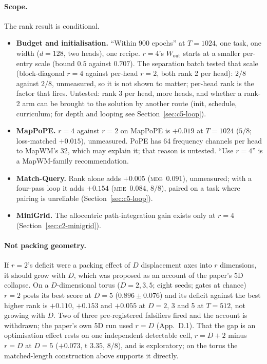 \documentclass[10pt]{article}
\newcommand{\mde}{\textsc{mde}}
\begin{document}
\paragraph{Scope.} The rank result is conditional.
\begin{itemize}
\item \textbf{Budget and initialisation.} ``Within 900 epochs'' at $T=1024$, one task, one width ($d=128$, two
heads), one recipe. $r=4$'s $W_{\mathrm{out}}$ starts at a smaller per-entry scale (bound $0.5$ against $0.707$). The
separation batch tested that scale (block-diagonal $r=4$ against per-head $r=2$, both rank 2 per head): $2/8$
against $2/8$, unmeasured, so it is not shown to matter; per-head rank is the factor that fires. Untested: rank
3 per head, more heads, and whether a rank-2 arm can be brought to the solution by another route (init,
schedule, curriculum; for depth and looping see Section~\ref{sec:c5-loop}).
\item \textbf{MapPoPE.} $r=4$ against $r=2$ on MapPoPE is $+0.019$ at $T=1024$ ($5/8$; loss-matched
$+0.015$), unmeasured. PoPE has 64 frequency channels per head to MapWM's 32, which may explain it; that reason
is untested. ``Use $r=4$'' is a MapWM-family recommendation. %
\item \textbf{Match-Query.} Rank alone adds $+0.005$ (\mde\ $0.091$), unmeasured; with a four-pass loop
it adds $+0.154$ (\mde\ $0.084$, $8/8$), paired on a task where pairing is unreliable (Section~\ref{sec:c5-loop}). %
\item \textbf{MiniGrid.} The allocentric path-integration gain exists only at $r=4$
(Section~\ref{sec:c2-minigrid}). %
\end{itemize}

\paragraph{Not packing geometry.} If $r=2$'s deficit were a packing effect of $D$ displacement axes into
$r$ dimensions, it should grow with $D$, which was proposed as an account of the paper's 5D collapse.
On a $D$-dimensional torus ($D=2,3,5$; eight seeds; gates at chance) $r=2$ posts its best score at $D=5$
($0.896\pm0.076$) and its deficit against the best higher rank is $+0.110$, $+0.153$ and $+0.055$ at
$D=2$, 3 and 5 at $T=512$, not growing with $D$. Two of three pre-registered falsifiers fired and the
account is withdrawn; the paper's own 5D run used $r=D$ (App.~D.1). That the gap is an optimisation effect rests on
one independent detectable cell, $r=D+2$ minus $r=D$ at $D=5$ ($+0.073$, t $3.35$, $8/8$), and is exploratory;
on the torus the matched-length construction above supports it directly.
\end{document}
